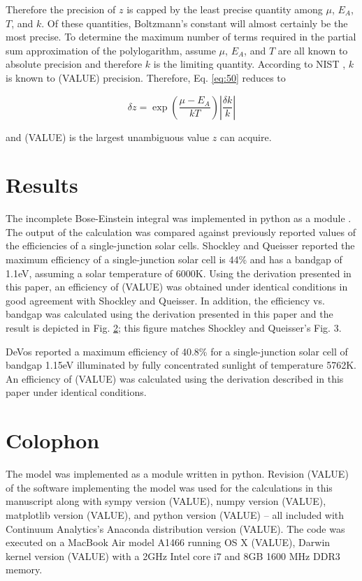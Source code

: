 \documentclass[letterpaper,12pt]{article}
\begin{document}
\noindent Therefore the precision of $z$ is capped by the least precise quantity among $\mu$, $E_{A}$, $T$, and $k$. Of these quantities, Boltzmann's constant will almost certainly be the most precise. To determine the maximum number of terms required in the partial sum approximation of the polylogarithm, assume $\mu$, $E_{A}$, and $T$ are all known to absolute precision and therefore $k$ is the limiting quantity. According to NIST \cite{}, $k$ is known to (VALUE) precision. Therefore, Eq. \ref{eq:50} reduces to

\begin{equation} \label{eq:51}
\delta z = \exp \left( \frac{\mu - E_{A}}{kT} \right) \left| \frac{\delta k}{k} \right|
\end{equation}

\noindent and (VALUE) is the largest unambiguous value $z$ can acquire.


\section{Results}
The incomplete Bose-Einstein integral was implemented in python as a module \cite{}. The output of the calculation was compared against previously reported values of the efficiencies of a single-junction solar cells. Shockley and Queisser \cite{10.1063/1.1736034} reported the maximum efficiency of a single-junction solar cell is 44\% and has a bandgap of 1.1eV, assuming a solar temperature of 6000K. Using the derivation presented in this paper, an efficiency of (VALUE) was obtained under identical conditions in good agreement with Shockley and Queisser. In addition, the efficiency vs. bandgap was calculated using the derivation presented in this paper and the result is depicted in Fig. \ref{}; this figure matches Shockley and Queisser's Fig. 3.

DeVos \cite{9780198513926} reported a maximum efficiency of 40.8\% for a single-junction solar cell of bandgap 1.15eV illuminated by fully concentrated sunlight of temperature 5762K. An efficiency of (VALUE) was calculated using the derivation described in this paper under identical conditions.


\section{Colophon}
The model was implemented as a module written in python. Revision (VALUE) \cite{} of the software implementing the model was used for the calculations in this manuscript along with sympy version (VALUE), numpy version (VALUE), matplotlib version (VALUE), and python version (VALUE) -- all included with Continuum Analytics's Anaconda distribution version (VALUE).  The code was executed on a MacBook Air model A1466 running OS X (VALUE), Darwin kernel version (VALUE) with a 2GHz Intel core i7 and 8GB 1600 MHz DDR3 memory.
\end{document}
